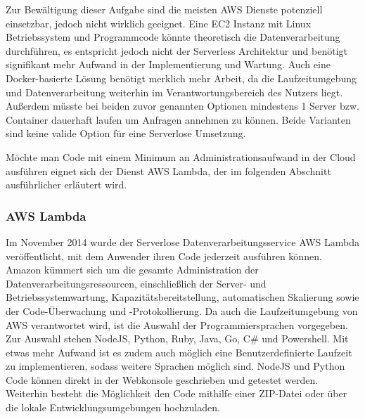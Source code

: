 {Zur Bewältigung dieser Aufgabe sind die meisten AWS Dienste potenziell einsetzbar, jedoch nicht wirklich geeignet.
Eine EC2 Instanz mit Linux Betriebssystem und Programmcode könnte theoretisch die Datenverarbeitung durchführen, es entspricht jedoch nicht der Serverless Architektur und benötigt signifikant mehr Aufwand in der Implementierung und Wartung.
Auch eine Docker-basierte Lösung benötigt merklich mehr Arbeit, da die Laufzeitumgebung und Datenverarbeitung weiterhin im Verantwortungsbereich des Nutzers liegt.
Außerdem müsste bei beiden zuvor genannten Optionen mindestens 1 Server bzw. Container dauerhaft laufen um Anfragen annehmen zu können.
Beide Varianten sind keine valide Option für eine Serverlose Umsetzung.

Möchte man Code mit einem Minimum an Administrationsaufwand in der Cloud ausführen eignet sich der Dienst AWS Lambda, der im folgenden Abschnitt ausführlicher erläutert wird.

\subsubsection{AWS Lambda}
\label{Lambda}
Im November 2014 wurde der Serverlose Datenverarbeitungsservice AWS Lambda veröffentlicht, mit dem Anwender ihren Code jederzeit ausführen können.
Amazon kümmert sich um die \glqq gesamte Administration der Datenverarbeitungsressourcen, einschließlich der Server- und Betriebssystemwartung, Kapazitätsbereitstellung, automatischen Skalierung sowie der Code-Überwachung und -Protokollierung.\grqq{} \cite[]{LambdaZitat}
Da auch die Laufzeitumgebung von AWS verantwortet wird, ist die Auswahl der Programmiersprachen vorgegeben.
Zur Auswahl stehen NodeJS, Python, Ruby, Java, Go, C\# und Powershell.
Mit etwas mehr Aufwand ist es zudem auch möglich eine Benutzerdefinierte Laufzeit zu implementieren, sodass weitere Sprachen möglich sind.
NodeJS und Python Code können direkt in der Webkonsole geschrieben und getestet werden.
Weiterhin besteht die Möglichkeit den Code mithilfe einer ZIP-Datei oder über die lokale Entwicklungsumgebungen hochzuladen.\cite[]{LambdaFAQ}

}
